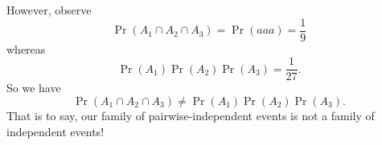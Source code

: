 However, observe
\begin{equation}
\Pr(A_1\cap A_2\cap A_3)=\Pr(aaa)=\frac{1}{9}
\end{equation}
whereas
\begin{equation}
\Pr(A_1)\Pr(A_2)\Pr(A_3)=\frac{1}{27}.
\end{equation}
So we have
\begin{equation}
\Pr(A_1\cap A_2\cap A_3)\neq\Pr(A_1)\Pr(A_2)\Pr(A_3).
\end{equation}
That is to say, our family of pairwise-independent events is not a
family of independent events!
